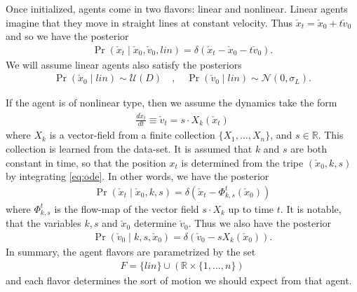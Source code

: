 \documentclass[conference]{IEEEtran}
\begin{document}
Once initialized, agents come in two flavors: linear and nonlinear.
Linear agents imagine that they move in straight lines at constant velocity.
Thus $\check{x}_t = \check{x}_0 + t \check{v}_0$ and so we have the posterior
\begin{align*}
	\Pr( \check{x}_t \mid \check{x}_0, \check{v}_0, lin) = \delta( \check{x}_t - \check{x}_0 - t \check{v}_0 ).
\end{align*}
We will assume linear agents also satisfy the posteriors
\begin{align*}
	\Pr( \check{x}_0 \mid lin ) \sim \mathcal{U}( D)\quad,\quad \Pr( \check{v}_0 \mid lin ) \sim \mathcal{N}( 0 , \sigma_L).
\end{align*}

If the agent is of nonlinear type, then we assume the dynamics take the form
\begin{align}
	\frac{d \check{x}_t}{dt} \equiv \check{v}_t = s \cdot X_k(\check{x}_t) \label{eq:ode}
\end{align}
where $X_k$ is a vector-field from a finite collection $\{X_1, \dots, X_n\}$, and $s \in \mathbb{R}$.
This collection is learned from the data-set.
It is assumed that $k$ and $s$ are both constant in time, so that the position $x_t$ is determined from the
tripe $(\check{x}_0,k,s)$ by integrating \eqref{eq:ode}.
In other words, we have the posterior
\begin{align*}
	\Pr( \check{x}_t \mid \check{x}_0 , k , s) = \delta( \check{x}_t - \Phi^{t}_{k,s}( \check{x}_0) )
\end{align*}
where $\Phi^{t}_{k,s}$ is the flow-map of the vector field $s \cdot X_k$ up to time $t$.
It is notable, that the variables $k,s$ and $\check{x}_0$ determine $\check{v}_0$.
Thus we also have the posterior
\begin{align*}
	\Pr( \check{v}_0 \mid k,s, \check{x}_0) = \delta( \check{v}_0 -s X_k( \check{x}_0) ).
\end{align*}
In summary, the agent flavors are parametrized by the set
\begin{align*}
	F = \{ lin \} \cup \left( \mathbb{R} \times \{ 1 , \dots, n \} \right)
\end{align*}
and each flavor determines the sort of motion we should expect from that agent.
\end{document}
